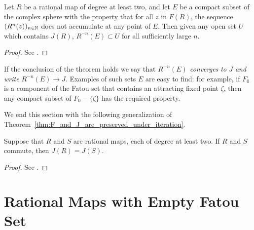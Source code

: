 \begin{theorem}
    \label{thm:R_inverse_n_E_converges_to_J}
    Let $R$ be a rational map of degree at least two, and let $E$ be a compact
    subset of the complex sphere with the property that for all $z$ in $F(R)$,
    the sequence $(R^n(z))_{n \in \mathbb{N}}$ does not accumulate at any point of $E$.
    Then given any open set $U$ which contains $J(R)$, $R^{-n}(E) \subset U$ for
    all sufficiently large $n$.
\end{theorem}
\begin{proof}
    See \cite[72]{Beardon1991}.
\end{proof}

\begin{remark}[Notation $R^{-n}(E) \to J$]
    If the conclusion of the theorem holds we say that \emph{$R^{-n}(E)$
    converges to $J$ and write $R^{-n}(E) \to J$}. Examples of such sets $E$ are
    easy to find: for example, if $F_0$ is a component of the Fatou set that
    contains an attracting fixed point $\zeta$, then any compact subset of $F_0
    - \{\zeta\}$ has the required property.
\end{remark}

We end this section with the following generalization of
Theorem~\ref{thm:F_and_J_are_preserved_under_iteration}.

\begin{theorem}
    Suppose that $R$ and $S$ are rational maps, each of degree at least two. If
    $R$ and $S$ commute, then $J(R) = J(S)$.
\end{theorem}
\begin{proof}
    See \cite[72--73]{Beardon1991}.
\end{proof}

\section{Rational Maps with Empty Fatou Set}
\label{sec:rational_maps_with_empty_Fatou_set}

